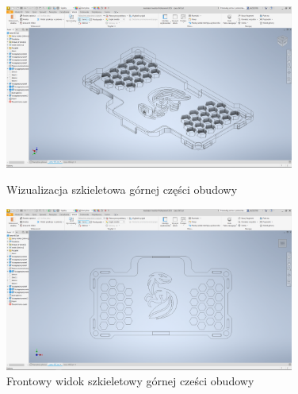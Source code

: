 \clearpage
\begin{figure}[htbp]
\centering
	\includegraphics[width=0.85\textwidth]{root/cover_top_wireframe.png}
	\caption{Wizualizacja szkieletowa górnej części obudowy}
	\vspace{1cm}
	\includegraphics[width=0.85\textwidth]{root/cover_top_wireframe_front.png}
	\caption{Frontowy widok szkieletowy górnej cześci obudowy}
\end{figure}

